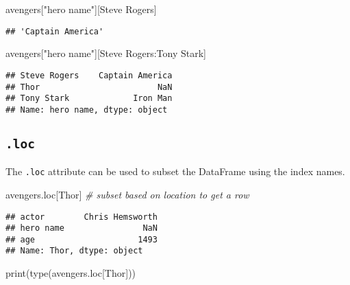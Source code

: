 \documentclass[
]{book}
\newenvironment{Shaded}{\begin{snugshade}}{\end{snugshade}}
\newcommand{\BuiltInTok}[1]{#1}
\newcommand{\CommentTok}[1]{\textcolor[rgb]{0.56,0.35,0.01}{\textit{#1}}}
\newcommand{\NormalTok}[1]{#1}
\newcommand{\StringTok}[1]{\textcolor[rgb]{0.31,0.60,0.02}{#1}}
\begin{document}
\begin{Shaded}
\begin{Highlighting}[]
\NormalTok{avengers[}\StringTok{"hero name"}\NormalTok{][}\StringTok{\textquotesingle{}Steve Rogers\textquotesingle{}}\NormalTok{]}
\end{Highlighting}
\end{Shaded}

\begin{verbatim}
## 'Captain America'
\end{verbatim}

\begin{Shaded}
\begin{Highlighting}[]
\NormalTok{avengers[}\StringTok{"hero name"}\NormalTok{][}\StringTok{\textquotesingle{}Steve Rogers\textquotesingle{}}\NormalTok{:}\StringTok{\textquotesingle{}Tony Stark\textquotesingle{}}\NormalTok{]}
\end{Highlighting}
\end{Shaded}

\begin{verbatim}
## Steve Rogers    Captain America
## Thor                        NaN
## Tony Stark             Iron Man
## Name: hero name, dtype: object
\end{verbatim}

\hypertarget{loc}{%
\subsection{\texorpdfstring{\texttt{.loc}}{.loc}}\label{loc}}

The \texttt{.loc} attribute can be used to subset the DataFrame using the index names.

\begin{Shaded}
\begin{Highlighting}[]
\NormalTok{avengers.loc[}\StringTok{\textquotesingle{}Thor\textquotesingle{}}\NormalTok{] }\CommentTok{\# subset based on location to get a row}
\end{Highlighting}
\end{Shaded}

\begin{verbatim}
## actor        Chris Hemsworth
## hero name                NaN
## age                     1493
## Name: Thor, dtype: object
\end{verbatim}

\begin{Shaded}
\begin{Highlighting}[]
\BuiltInTok{print}\NormalTok{(}\BuiltInTok{type}\NormalTok{(avengers.loc[}\StringTok{\textquotesingle{}Thor\textquotesingle{}}\NormalTok{]))}
\end{Highlighting}
\end{Shaded}
\end{document}
